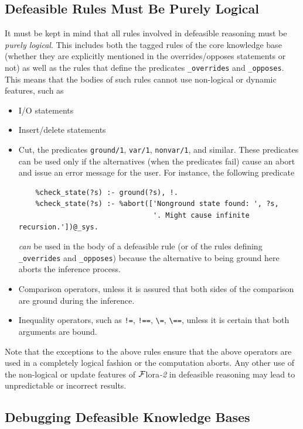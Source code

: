 \documentclass[11pt]{article}
\newcommand{\FLORA}{{\mbox{\sc ${\cal F}${lora}\rm\emph{-2}}}\xspace}
\begin{document}
\subsection{Defeasible Rules Must Be Purely Logical}

It must be kept in mind that all rules involved in defeasible reasoning
must be \emph{purely logical}. This includes both the tagged rules of the
core knowledge base (whether they are explicitly mentioned in the
overrides/opposes statements or not) as well as the rules that define the
predicates {\tt \_overrides} and {\tt \_opposes}.  This means that the
bodies of such rules cannot use non-logical or dynamic features, such as
\begin{itemize}
\item  I/O statements
\item  Insert/delete statements
\item  Cut, the predicates {\tt ground/1}, {\tt var/1}, {\tt nonvar/1}, and
  similar.
  These predicates can be used only if the alternatives (when
  the predicates fail) cause an abort and issue an error message for the user.
  For instance, the following predicate
\begin{verbatim}
    %check_state(?s) :- ground(?s), !.
    %check_state(?s) :- %abort(['Nonground state found: ', ?s,
                                '. Might cause infinite recursion.'])@_sys.  
\end{verbatim}
  \emph{can} be used in the body of a defeasible rule (or of the rules defining
  {\tt \_overrides} and {\tt \_opposes}) because the alternative to being
  ground here aborts the inference process.
\item  Comparison operators, unless it is assured that both sides of the
  comparison are ground during the inference.
\item  Inequality operators, such as {\tt !=}, {\tt !==}, \verb|\=|,
  \verb|\==|,  unless it is certain that both arguments are bound.
\end{itemize}
Note that the exceptions to the above rules ensure that the above operators
are used in a completely logical fashion or the computation aborts. Any
other use of the non-logical or update features of \FLORA in defeasible
reasoning may lead to unpredictable or incorrect results.


\subsection{Debugging Defeasible Knowledge Bases}
\label{sec-debugging-defeat}
\end{document}
